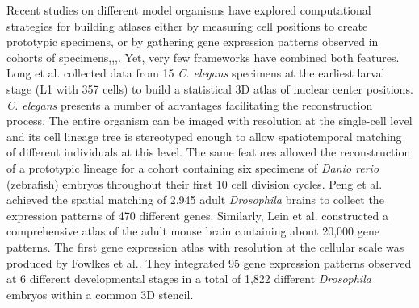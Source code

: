 Recent studies on different model organisms have explored computational strategies for building atlases either by measuring cell positions to create prototypic specimens\cite{long20093d},\cite{olivier2010cell} or by gathering gene expression patterns observed in cohorts of specimens\cite{lein2007genome},\cite{fowlkes2008quantitative},\cite{peng2011brainaligner},\cite{asadulina2012whole}. Yet, very few frameworks have combined both features. Long et al.\cite{long20093d} collected data from 15 \emph{C. elegans} specimens at the earliest larval stage (L1 with 357 cells) to build a statistical 3D atlas of nuclear center positions. \emph{C. elegans} presents a number of advantages facilitating the reconstruction process. The entire organism can be imaged with resolution at the single-cell level and its cell lineage tree is stereotyped enough to allow spatiotemporal matching of different individuals at this level. The same features allowed the reconstruction of a prototypic lineage for a cohort containing six specimens of \emph{Danio rerio} (zebrafish) embryos throughout their first 10 cell division cycles\cite{olivier2010cell}. Peng et al.\cite{peng2011brainaligner} achieved the spatial matching of 2,945 adult \emph{Drosophila} brains to collect the expression patterns of 470 different genes. Similarly, Lein et al.\cite{lein2007genome} constructed a comprehensive atlas of the adult mouse brain containing about 20,000 gene patterns. The first gene expression atlas with resolution at the cellular scale was produced by Fowlkes et al.\cite{fowlkes2008quantitative}. They integrated 95 gene expression patterns observed at 6 different developmental stages in a total of 1,822 different \emph{Drosophila} embryos within a common 3D stencil.



